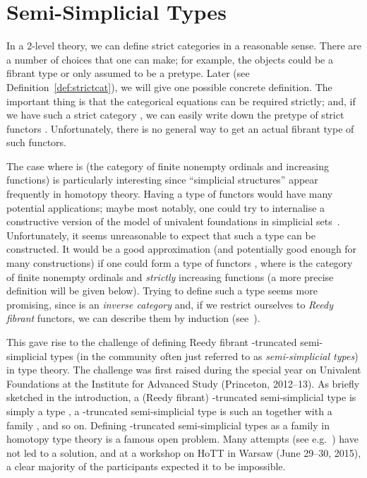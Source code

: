 \documentclass[a4paper,reqno]{amsart}
\theoremstyle{plain}
\theoremstyle{definition}
\begin{document}
\newcommand{\sst}{\mathsf{SST}}
\newcommand{\ssx}{\mathsf{SS}}
\newcommand{\ssk}{\mathsf{SK}}
\newcommand{\sskmor}{\mathsf{SK}^\to}
\newcommand{\ssfunclaw}{\mathsf{\alpha}}


\section{Semi-Simplicial Types} \label{sec:semisimp}

In a 2-level theory, we can define strict categories in a reasonable sense. 
There are a number of choices that one can make; 
for example, the objects could be a fibrant type or only assumed to be a pretype.
Later (see Definition~\ref{def:strictcat}), we will give one possible concrete definition.
The important thing is that the categorical equations can be required strictly; and, if we have such a strict category , we can easily write down the pretype of strict functors .
Unfortunately, there is no general way to get an actual fibrant type of such functors.

The case where  is  (the category of finite nonempty ordinals and increasing functions) is particularly interesting since ``simplicial structures'' appear frequently in homotopy theory.
Having a type of functors  would have many potential applications; 
maybe most notably, one could try to internalise a constructive version of the model of univalent foundations in simplicial sets~\cite{kapLumsVoe_ssModelOfUF}.
Unfortunately, it seems unreasonable to expect that such a type can be constructed.
It would be a good approximation (and potentially good enough for many constructions) if one could form a type of functors , where  is the category of finite nonempty ordinals and \emph{strictly} increasing functions (a more precise definition will be given below).
Trying to define such a type seems more promising, since  is an \emph{inverse category} and, if we restrict ourselves to \emph{Reedy fibrant} functors, we can describe them by induction (see~\cite{shulman_inversediagrams}).

This gave rise to the challenge of defining Reedy fibrant -truncated semi-simplicial types (in the community often just referred to as \emph{semi-simplicial types}) in type theory.
The challenge was first raised during the special year on Univalent Foundations at the Institute for Advanced Study (Princeton, 2012--13).
As briefly sketched in the introduction, a (Reedy fibrant) -truncated semi-simplicial type is simply a type , a -truncated semi-simplicial type is such an  together with a family , and so on.
Defining -truncated semi-simplicial types as a family  in homotopy type theory is a famous open problem.
Many attempts (see e.g.\ \cite{herbelin_semisimpl,shulman:eating,nicolai:thesis}) have not led to a solution, and at a workshop on HoTT in Warsaw (June 29--30, 2015), a clear majority of the participants expected it to be impossible.
\end{document}
